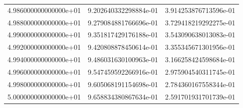 \documentclass[pdf,color]{UoBnote}
\begin{document}
\begin{table}[H]
{\begin{tabular}{l|l|l}
    4.986000000000000e+01 & 9.202640332298884e-01 & 3.914253876713596e-01  \\
    4.988000000000000e+01 & 9.279084881766696e-01 & 3.729418219292275e-01  \\
    4.990000000000000e+01 & 9.351817429176188e-01 & 3.543090638013083e-01  \\
    4.992000000000000e+01 & 9.420808878450614e-01 & 3.355345671301956e-01  \\
    4.994000000000000e+01 & 9.486031630100963e-01 & 3.166258424598684e-01  \\
    4.996000000000000e+01 & 9.547459592266916e-01 & 2.975904540311745e-01  \\
    4.998000000000000e+01 & 9.605068191154698e-01 & 2.784360167558344e-01  \\
    5.000000000000000e+01 & 9.658834380867634e-01 & 2.591701931701739e-01  \\
    \end{tabular}
    }
\end{table}
\end{document}
